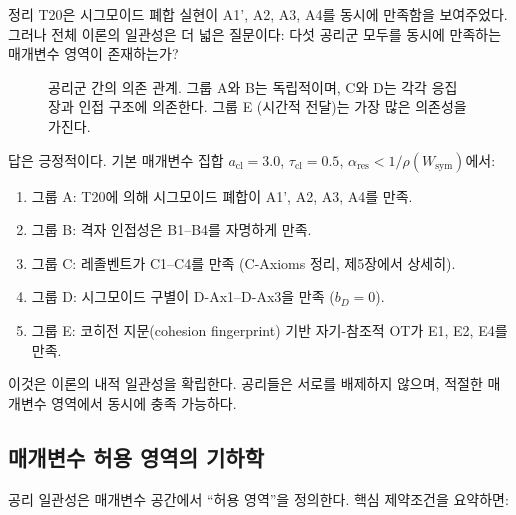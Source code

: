 정리 T20은 시그모이드 폐합 실현이 A1', A2, A3, A4를 동시에 만족함을 보여주었다. 그러나 전체 이론의 일관성은 더 넓은 질문이다: 다섯 공리군 모두를 동시에 만족하는 매개변수 영역이 존재하는가?

\begin{figure}[t]
\centering
\caption{공리군 간의 의존 관계. 그룹 A와 B는 독립적이며, C와 D는 각각 응집 장과 인접 구조에 의존한다. 그룹 E (시간적 전달)는 가장 많은 의존성을 가진다.}
\label{fig:axiom-dependency}
\end{figure}

답은 긍정적이다. 기본 매개변수 집합 $a_{\mathrm{cl}} = 3.0$, $\tau_{\mathrm{cl}} = 0.5$, $\alpha_{\mathrm{res}} < 1/\rho(W_{\mathrm{sym}})$에서:
\begin{enumerate}
    \item 그룹 A: T20에 의해 시그모이드 폐합이 A1', A2, A3, A4를 만족.
    \item 그룹 B: 격자 인접성은 B1--B4를 자명하게 만족.
    \item 그룹 C: 레졸벤트가 C1--C4를 만족 (C-Axioms 정리, 제5장에서 상세히).
    \item 그룹 D: 시그모이드 구별이 D-Ax1--D-Ax3을 만족 ($b_D = 0$).
    \item 그룹 E: 코히전 지문(cohesion fingerprint) 기반 자기-참조적 OT가 E1, E2, E4를 만족.
\end{enumerate}

이것은 이론의 내적 일관성을 확립한다. 공리들은 서로를 배제하지 않으며, 적절한 매개변수 영역에서 동시에 충족 가능하다.

\subsection{매개변수 허용 영역의 기하학}

공리 일관성은 매개변수 공간에서 ``허용 영역''을 정의한다. 핵심 제약조건을 요약하면:

